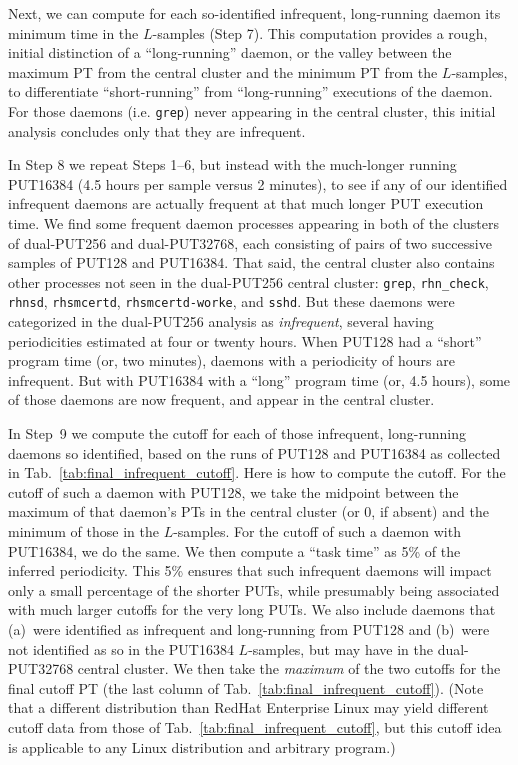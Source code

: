 \documentclass[letter]{ieice}
\begin{document}
Next, we can compute for each so-identified infrequent, long-running daemon its
minimum time in the \hbox{$L$-samples} (Step 7). 
This computation provides a rough, initial distinction of a ``long-running''
daemon, or the valley between the maximum PT from the central cluster 
and the minimum PT from the $L$-samples, to differentiate ``short-running'' 
from ``\hbox{long-running}'' executions of the daemon. 
For those daemons (i.e. {\tt grep}) never appearing in the central cluster,
this initial \hbox{analysis} concludes only that they are infrequent.

In Step 8 we repeat Steps 1--6, but instead with the much-longer running
PUT16384 (4.5 hours per \hbox{sample} versus 2 minutes), to see 
if any of our identified \hbox{infrequent} daemons are actually frequent 
at that much longer PUT execution time. 
We find some frequent daemon processes appearing in both of the 
clusters of \hbox{dual-PUT256} and \hbox{dual-PUT32768}, each consisting of 
pairs of two successive samples of PUT128 and PUT16384.
That said, the central cluster also contains other
  processes not seen in the \hbox{dual-PUT256} central cluster: 
  {\tt grep}, {\tt rhn\_check}, {\tt rhnsd}, {\tt rhsmcertd}, 
  {\tt rhsmcertd-worke}, and {\tt sshd}. 
  But these daemons were categorized in the \hbox{dual-PUT256} analysis as {\em
  infrequent}, several having \hbox{periodicities} estimated at four or twenty hours.
When PUT128 had a ``short'' 
program time (or, two minutes), daemons with a periodicity of
hours are \hbox{infrequent}. But with PUT16384 
with a ``long'' program time (or, 4.5 hours),
some of those daemons are now frequent, and appear in the central cluster.

In Step~9 we compute 
the cutoff for each of those infrequent, long-running daemons so
identified, based on the runs of PUT128 and 
PUT16384 as collected in Tab.~\ref{tab:final_infrequent_cutoff}. 
Here is how to compute the cutoff. For the cutoff of such a daemon with PUT128, 
we take the \hbox{midpoint} between the maximum of that daemon's PTs in the 
central cluster (or 0, if absent) and the \hbox{minimum} of those in the $L$-samples. 
For the cutoff of such a daemon with PUT16384, we do the same. 
We then compute a ``task time'' as 5\% of the inferred periodicity. 
This 5\% ensures that such infrequent daemons will impact 
only a small percentage of the shorter PUTs, while presumably being 
associated with much larger cutoffs for the very long PUTs. 
We also include daemons that (a)~were identified as infrequent and 
\hbox{long-running} from PUT128 and (b)~were not identified as so in the PUT16384 
\hbox{$L$-samples}, but may have in the \hbox{dual-PUT32768} central cluster.
We then take the {\em maximum} of the two cutoffs for the final cutoff PT 
(the last column of Tab.~\ref{tab:final_infrequent_cutoff}). 
(Note that a different distribution than RedHat Enterprise Linux may yield different cutoff data from those of Tab.~\ref{tab:final_infrequent_cutoff}, but this cutoff idea is applicable to any Linux distribution and arbitrary program.)
\end{document}
